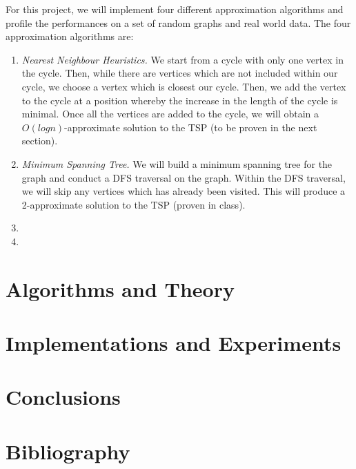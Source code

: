 \documentclass[paper=a4, fontsize=11pt]{scrartcl}	%
\numberwithin{equation}{section}		%
\numberwithin{figure}{section}			%
\numberwithin{table}{section}				%
\begin{document}
For this project, we will implement four different approximation algorithms and profile the performances on a set of random graphs and real world data. The four approximation algorithms are:
\begin{enumerate}
\item \textit{Nearest Neighbour Heuristics.} We start from a cycle with only one vertex in the cycle. Then, while there are vertices which are not included within our cycle, we choose a vertex which is closest our cycle. Then, we add the vertex to the cycle at a position whereby the increase in the length of the cycle is minimal. Once all the vertices are added to the cycle, we will obtain a $O(log n)$-approximate solution to the TSP (to be proven in the next section).  
\item \textit{Minimum Spanning Tree.} We will build a minimum spanning tree for the graph and conduct a DFS traversal on the graph. Within the DFS traversal, we will skip any vertices which has already been visited. This will produce a 2-approximate solution to the TSP (proven in class).
\item 
\item 
\end{enumerate}

\section{Algorithms and Theory}

\section{Implementations and Experiments}

\section{Conclusions}

\section{Bibliography}

\nocite{*}

\end{document}
